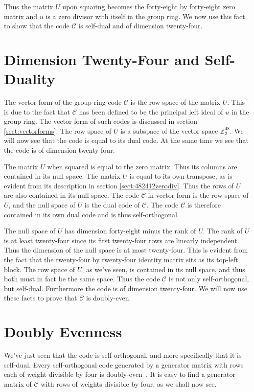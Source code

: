 Thus the matrix $U$ upon squaring becomes the forty-eight by forty-eight zero matrix and $u$ is a zero divisor with itself in the group ring.
We now use this fact to show that the code $\mathcal{C}$ is self-dual and of dimension twenty-four.

\section{Dimension Twenty-Four and Self-Duality}
The vector form of the group ring code $\mathcal{C}$ is the row space of the matrix $U$.
This is due to the fact that $\mathcal{C}$ has been defined to be the principal left ideal of $u$ in the group ring.
The vector form of such codes is discussed in section \ref{sect:vectorforms}.
The row space of $U$ is a subspace of the vector space $\mathbb{Z}_2^{48}$.
We will now see that the code is equal to its dual code.
At the same time we see that the code is of dimension twenty-four.

The matrix $U$ when squared is equal to the zero matrix.
Thus its columns are contained in its null space.
The matrix $U$ is equal to its own transpose, as is evident from its description in section \ref{sect:482412zerodiv}.
Thus the rows of $U$ are also contained in its null space.
The code $\mathcal{C}$ in vector form is the row space of $U$, and the null space of $U$ is the dual code of $\mathcal{C}$.
The code $\mathcal{C}$ is therefore contained in its own dual code and is thus self-orthogonal.

The null space of $U$ has dimension forty-eight minus the rank of $U$.
The rank of $U$ is at least twenty-four since its first twenty-four rows are linearly independent.
Thus the dimension of the null space is at most twenty-four.
This is evident from the fact that the twenty-four by twenty-four identity matrix sits as its top-left block.
The row space of $U$, as we've seen, is contained in its null space, and thus both must in fact be the same space.
Thus the code $\mathcal{C}$ is not only self-orthogonal, but self-dual.
Furthermore the code is of dimension twenty-four.
We will now use these facts to prove that $\mathcal{C}$ is doubly-even.

\section{Doubly Evenness}
We've just seen that the code is self-orthogonal, and more specifically that it is self-dual.
Every self-orthogonal code generated by a generator matrix with rows each of weight divisible by four is doubly-even~\cite[p.~10]{huf03}.
It is easy to find a generator matrix of $\mathcal{C}$ with rows of weights divisible by four, as we shall now see.

